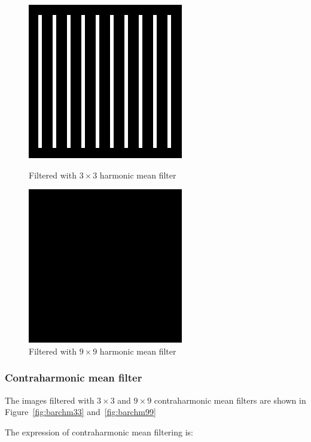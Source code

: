 \documentclass{article}
\begin{document}
\begin{figure}[H]
	\captionsetup{justification=centering,margin=1cm}
	\begin{minipage}[b]{0.48\linewidth}
		\centering
		\includegraphics[width=192pt]{../result/task1/harmonic-mean-3-3.png}
		\caption{Filtered with $3 \times 3$ harmonic mean filter}
		\label{fig:barhm33}
	\end{minipage}
	\begin{minipage}[b]{0.48\linewidth}
		\centering
		\includegraphics[width=192pt]{../result/task1/harmonic-mean-9-9.png}
		\caption{Filtered with $9 \times 9$ harmonic mean filter}
		\label{fig:barhm99}
	\end{minipage}
\end{figure}

\subsubsection{Contraharmonic mean filter}

The images filtered with $3 \times 3$ and $9 \times 9$ contraharmonic mean filters are shown in Figure~\ref{fig:barchm33} and~\ref{fig:barchm99}

The expression of contraharmonic mean filtering is:
\end{document}
